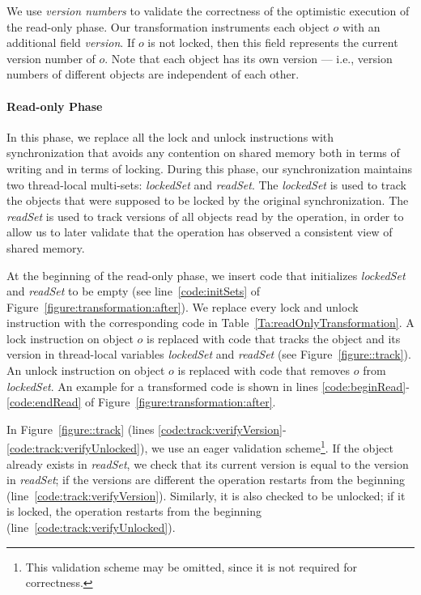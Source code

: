 We use \emph{version numbers} to validate the correctness of the optimistic execution of the read-only phase.
Our transformation instruments each object $o$ with an additional field \emph{version}.
If $o$ is not locked, then this field  represents the current version number of $o$.
Note that each object has its own version --- i.e., version numbers of different objects are independent of each other.

\paragraph{Read-only Phase}
In this phase, we replace all the lock and unlock instructions with synchronization that avoids any contention on shared memory both in terms of writing and in terms of locking.
During this phase, our synchronization maintains two thread-local multi-sets: \emph{lockedSet} and \emph{readSet}.
The \emph{lockedSet} is used to track the objects that were supposed to be locked by the original synchronization.
%
The \emph{readSet} is used to track versions of all objects read by the
operation, in order to allow us to later validate that the operation has observed a consistent view of shared memory.

At the beginning of the read-only phase, we insert code that initializes \emph{lockedSet} and \emph{readSet} to be empty (see  line~\ref{code:initSets} of Figure~\ref{figure:transformation:after}).
We replace every lock and unlock instruction with the corresponding code in Table~\ref{Ta:readOnlyTransformation}.
A lock instruction on object $o$ is replaced with code that tracks the object and its version in
thread-local variables \emph{lockedSet} and \emph{readSet} (see Figure~\ref{figure::track}).
An unlock instruction on object $o$ is replaced with code that removes $o$ from \emph{lockedSet}.
An example for a transformed code is shown in lines \ref{code:beginRead}-\ref{code:endRead} of Figure~\ref{figure:transformation:after}.

In Figure~\ref{figure::track} (lines \ref{code:track:verifyVersion}-\ref{code:track:verifyUnlocked}), we use an eager validation scheme\footnote{
This validation scheme may be omitted, since it is not required for correctness.
}.
If the object already exists in \emph{readSet}, we check that its current version is equal
to the version in \emph{readSet}; if the versions are different  the operation restarts from the beginning (line~\ref{code:track:verifyVersion}).
Similarly, it is also checked to be unlocked; if it is locked, the operation restarts from the beginning (line~\ref{code:track:verifyUnlocked}).



